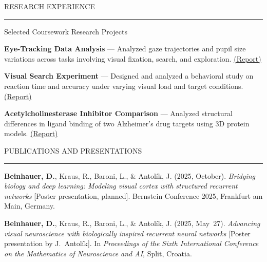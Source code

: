 \documentclass{resume} %
\renewenvironment{rSection}[1]{
\sectionskip
\textcolor{CarnegieMellonRed}{\MakeUppercase{#1}}
\sectionlineskip
\hrule
\begin{list}{}{
\setlength{\leftmargin}{1.5em}
}
\item[]
}{
\end{list}
}
\begin{document}
\begin{rSection}{Research Experience}
\begin{rProject}{\large Selected Coursework Research Projects}{}{}{}
\item \textbf{Eye-Tracking Data Analysis} — Analyzed gaze trajectories and pupil size variations across tasks involving visual fixation, search, and exploration. {\href{https://raw.githack.com/dbeinhauer/etra_challenge/main/etra_challenge_report.html}{(Report)}}
 
\item \textbf{Visual Search Experiment} — Designed and analyzed a behavioral study on reaction time and accuracy under varying visual load and target conditions. {\href{https://raw.githack.com/dbeinhauer/visual_search_experiment/main/visual-search-experiment-report.html}{(Report)}}
 
\item \textbf{Acetylcholinesterase Inhibitor Comparison} — Analyzed structural differences in ligand binding of two Alzheimer's drug targets using 3D protein models. {\href{https://github.com/dbeinhauer/acetylcholinester_inhibitors/blob/main/TeX/main.pdf}{(Report)}}
 
\end{rProject}

\end{rSection}


\newpage

\begin{rSection}{Publications and Presentations}

\begin{enumerate}[leftmargin=*, label={[\arabic*]}] \itemsep -6pt

\item \textbf{Beinhauer, D.}, Kraus, R., Baroni, L., \& Antolík, J. (2025, October). 
\textit{Bridging biology and deep learning: Modeling visual cortex with structured recurrent networks} [Poster presentation, planned]. 
Bernstein Conference 2025, Frankfurt am Main, Germany.

\item \textbf{Beinhauer, D.}, Kraus, R., Baroni, L., \& Antolík, J. (2025, May~27). 
\textit{Advancing visual neuroscience with biologically inspired recurrent neural networks} [Poster presentation by J.~Antolík]. 
In \textit{Proceedings of the Sixth International Conference on the Mathematics of Neuroscience and AI}, Split, Croatia.

\end{enumerate}

\end{rSection}
\end{document}
